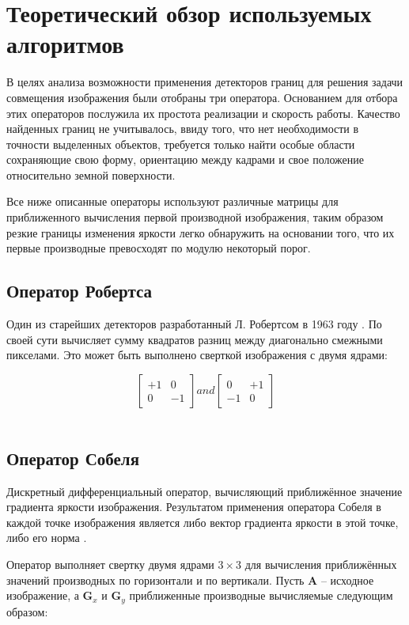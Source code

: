 \section{Теоретический обзор используемых алгоритмов}
\label{sec:realization}
В целях анализа возможности применения детекторов границ для решения задачи совмещения изображения были отобраны три оператора. Основанием для отбора этих операторов послужила их простота реализации и скорость работы. Качество найденных границ не учитывалось, ввиду того, что нет необходимости в точности выделенных объектов, требуется только найти особые области сохраняющие свою форму, ориентацию между кадрами и свое положение относительно земной поверхности.

Все ниже описанные операторы используют различные матрицы для приближенного вычисления первой производной изображения, таким образом резкие границы изменения яркости легко обнаружить на основании того, что их первые производные превосходят по модулю некоторый порог.
\subsection{Оператор Робертса}
Один из старейших детекторов разработанный Л. Робертсом в 1963 году \cite{RobertsPhD}. По своей сути вычисляет сумму квадратов разниц между диагонально смежными пикселами. Это может быть выполнено сверткой изображения с двумя ядрами:

\begin{equation}
\begin{bmatrix}
+1 & 0\\
0 & -1
\end{bmatrix}
and
\begin{bmatrix}
0 & +1\\
-1 & 0
\end{bmatrix}
\end{equation}
\\
\subsection{Оператор Собеля}
Дискретный дифференциальный оператор, вычисляющий приближённое значение градиента яркости изображения. Результатом применения оператора Собеля в каждой точке изображения является либо вектор градиента яркости в этой точке, либо его норма \cite{Sobel_14}. 

Оператор выполняет свертку двумя ядрами $3 \times 3$ для вычисления приближённых значений производных по горизонтали и по вертикали. Пусть $\mathbf{A}$ -- исходное изображение, а $\mathbf{G}_x$ и $\mathbf{G}_y$ приближенные производные вычисляемые следующим образом:

